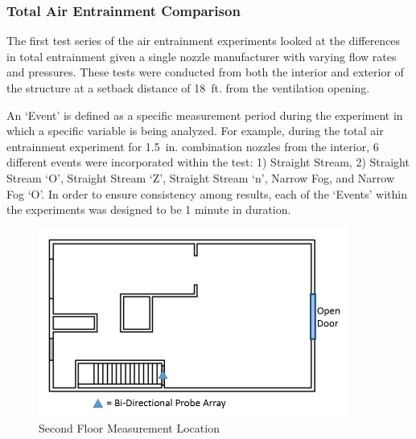 \documentclass[12pt,oneside]{book}
\begin{document}


\subsubsection{Total Air Entrainment Comparison}

The first test series of the air entrainment experiments looked at the differences in total entrainment given a single nozzle manufacturer with varying flow rates and pressures. These tests were conducted from both the interior and exterior of the structure at a setback distance of 18~ft. from the ventilation opening. 

An `Event' is defined as a specific measurement period during the experiment in which a specific variable is being analyzed. For example, during the total air entrainment experiment for 1.5~in. combination nozzles from the interior, 6 different events were incorporated within the test: 1) Straight Stream, 2) Straight Stream `O', Straight Stream `Z', Straight Stream `n', Narrow Fog, and Narrow Fog `O'. In order to ensure consistency among results, each of the `Events' within the experiments was designed to be 1 minute in duration. 

\clearpage

\begin{figure}[!ht]
	\centering
	\includegraphics[width=4in]{Figures/Air_Entrainment/Measurement_Locations_Secondfloor}
	\caption{Second Floor Measurement Location}
	\label{fig:Second_Floor_Measurement_Location}
\end{figure}

\vspace*{\baselineskip}
\end{document}
